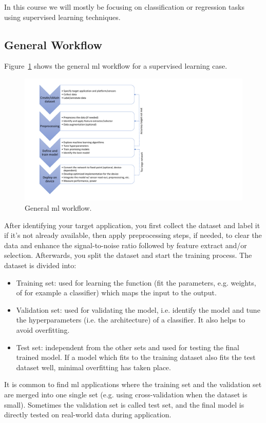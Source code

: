 \documentclass[parskip=half,notes,cadrem,toolver]{iisvlsi}
\begin{document}
In this course we will mostly be focusing on classification or regression tasks using supervised learning techniques.

\subsection{General Workflow}
Figure~\ref{fig:workflow} shows the general \gls{ml} workflow for a supervised learning case.

\begin{figure}[H]
    \begin{center}
        \includegraphics[trim={1.2cm, 0.8cm, 15cm, 1cm}, clip=true, width=0.6\linewidth]{figures/workflow-lab.pdf}
        \caption{General \gls{ml} workflow.}
        \label{fig:workflow}
    \end{center}
\end{figure}

After identifying your target application, you first collect the dataset and label it if it's not already available, then apply preprocessing steps, if needed, to clear the data and enhance the signal-to-noise ratio followed by feature extract and/or selection. Afterwards, you split the dataset and start the training process. The dataset is divided into:
\begin{itemize}
    \item Training set: used for learning the function (fit the parameters, e.g. weights, of for example a classifier) which maps the input to the output.
    \item Validation set: used for validating the model, i.e. identify the model and tune the hyperparameters (i.e. the architecture) of a classifier. It also helps to avoid overfitting.
    \item Test set: independent from the other sets and used for testing the final trained model. If a model which fits to the training dataset also fits the test dataset well, minimal overfitting has taken place.
\end{itemize}

It is common to find \gls{ml} applications where the training set and the validation set are merged into one single set (e.g. using cross-validation when the dataset is small). Sometimes the validation set is called test set, and the final model is directly tested on real-world data during application.
\end{document}
